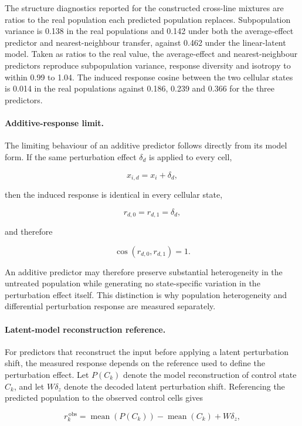 \documentclass[11pt,letterpaper]{article}
\begin{document}
The structure diagnostics reported for the constructed cross-line mixtures are ratios to the
real population each predicted population replaces. Subpopulation variance is 0.138 in the real
populations and 0.142 under both the average-effect predictor and nearest-neighbour transfer,
against 0.462 under the linear-latent model. Taken as ratios to the real value, the average-effect
and nearest-neighbour predictors reproduce subpopulation variance, response diversity and isotropy
to within 0.99 to 1.04. The induced response cosine between the two cellular states is 0.014 in
the real populations against 0.186, 0.239 and 0.366 for the three predictors.

\paragraph{Additive-response limit.}
The limiting behaviour of an additive predictor follows directly from its model form. If the same
perturbation effect $\delta_d$ is applied to every cell,

$$
\widehat{x}_{i,d}
=
x_i+\delta_d,
$$

then the induced response is identical in every cellular state,

$$
r_{d,0}
=
r_{d,1}
=
\delta_d,
$$

and therefore

$$
\cos
\left(
r_{d,0},
r_{d,1}
\right)
=
1.
$$

An additive predictor may therefore preserve substantial heterogeneity in the untreated population
while generating no state-specific variation in the perturbation effect itself. This distinction
is why population heterogeneity and differential perturbation response are measured separately.

\paragraph{Latent-model reconstruction reference.}
For predictors that reconstruct the input before applying a latent perturbation shift, the measured
response depends on the reference used to define the perturbation effect. Let $P(C_k)$ denote the
model reconstruction of control state $C_k$, and let $W\delta_z$ denote the decoded latent
perturbation shift. Referencing the predicted population to the observed control cells gives

$$
r^{\,\mathrm{obs}}_k
=
\operatorname{mean}
\left(
P(C_k)
\right)
-
\operatorname{mean}
\left(
C_k
\right)
+
W\delta_z,
$$
\end{document}
